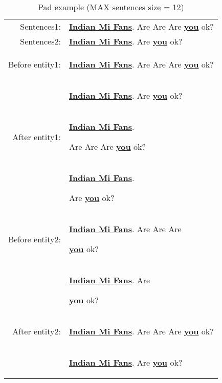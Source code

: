 \begin{table}[htbp!] %
    \centering
    \begin{tabular}{rl}
    \midrule
        Sentences1:     &\textbf{\underline{Indian Mi Fans}}. Are Are Are \textbf{\underline{you}} ok? \\
        Sentences2:     &\textbf{\underline{Indian Mi Fans}}. Are \textbf{\underline{you}} ok? \\ 
        Before entity1: &\begin{scriptsize}[PAD] [PAD] \end{scriptsize} \textbf{\underline{Indian Mi Fans}}.  Are Are Are \textbf{\underline{you}} ok? \\
                        &\begin{scriptsize}[PAD] [PAD] [PAD] [PAD] \end{scriptsize}  \textbf{\underline{Indian Mi Fans}}. Are \textbf{\underline{you}} ok? \\
        After entity1:  &\textbf{\underline{Indian Mi Fans}}. \begin{scriptsize}[PAD] [PAD] \end{scriptsize} Are Are Are \textbf{\underline{you}} ok?\\
                        &\textbf{\underline{Indian Mi Fans}}. \begin{scriptsize}[PAD] [PAD] [PAD] [PAD] \end{scriptsize}  Are \textbf{\underline{you}} ok?\\
        Before entity2: &\textbf{\underline{Indian Mi Fans}}.  Are Are Are \begin{scriptsize}[PAD] [PAD] \end{scriptsize} \textbf{\underline{you}} ok? \\
                        &\textbf{\underline{Indian Mi Fans}}. Are \begin{scriptsize}[PAD] [PAD] [PAD] [PAD] \end{scriptsize}  \textbf{\underline{you}} ok? \\
        After entity2:  &\textbf{\underline{Indian Mi Fans}}. Are Are Are \textbf{\underline{you}} ok? \begin{scriptsize}[PAD] [PAD] \end{scriptsize} \\
                        &\textbf{\underline{Indian Mi Fans}}. Are \textbf{\underline{you}} ok? \begin{scriptsize}[PAD] [PAD] [PAD] [PAD] \end{scriptsize}  \\
    \bottomrule
    \end{tabular}
\caption{Pad example (MAX sentences size = 12)}
\label{tab:model}
\end{table}
